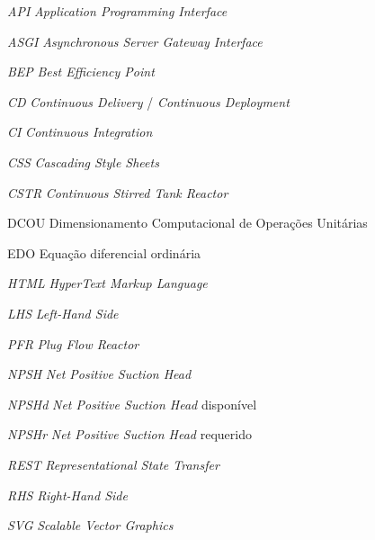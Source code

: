 \documentclass[
	12pt,				%
	openright,			%
	twoside,			%
	a4paper,			%
	english,			%
	brazil				%
	]{abntex2}
\begin{document}

\listoffigures*
\cleardoublepage

\listoftables*
\cleardoublepage

\begin{siglas}
  \item[\textit{API}] \textit{Application Programming Interface}
  \item[\textit{ASGI}] \textit{Asynchronous Server Gateway Interface}
  \item[\textit{BEP}] \textit{Best Efficiency Point}
  \item[\textit{CD}] \textit{Continuous Delivery} / \textit{Continuous Deployment}
  \item[\textit{CI}] \textit{Continuous Integration}
  \item[\textit{CSS}] \textit{Cascading Style Sheets}
  \item[\textit{CSTR}] \textit{Continuous Stirred Tank Reactor}
  \item[DCOU] Dimensionamento Computacional de Operações Unitárias
  \item[EDO] Equação diferencial ordinária
  \item[\textit{HTML}] \textit{HyperText Markup Language}
  \item[\textit{LHS}] \textit{Left-Hand Side}
  \item[\textit{PFR}] \textit{Plug Flow Reactor}
  \item[\textit{NPSH}] \textit{Net Positive Suction Head}
  \item[\textit{NPSHd}] \textit{Net Positive Suction Head} disponível
  \item[\textit{NPSHr}] \textit{Net Positive Suction Head} requerido
  \item[\textit{REST}] \textit{Representational State Transfer}
  \item[\textit{RHS}] \textit{Right-Hand Side}
  \item[\textit{SVG}] \textit{Scalable Vector Graphics}

\end{siglas}
\end{document}
